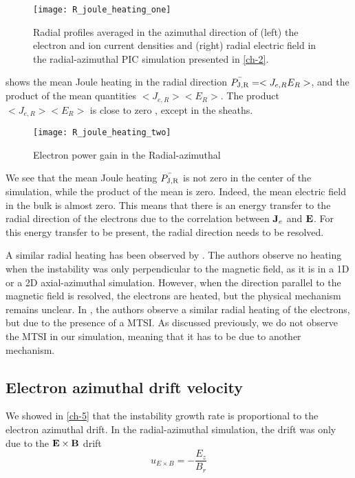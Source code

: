   \begin{figure}[hbt]
    \centering
    \texttt{[image: R\_joule\_heating\_one]}
    \caption{Radial profiles averaged in the azimuthal direction of (left) the electron and ion current densities and (right) radial electric field in the radial-azimuthal \ac{PIC} simulation presented in \cref{ch-2}. }
    \label{fig-epower_radialone}
  \end{figure}

   shows the mean Joule heating in the radial direction $\bar{P_{\rm J, R}} = < J_{e, R} E_R >$, and the product of the mean quantities $< J_{e, R}>  < E_R >$.
  The product $< J_{e, R}>  < E_R >$ is close to zero , except in the sheaths.

  \begin{figure}[hbt]
    \centering
    \texttt{[image: R\_joule\_heating\_two]}
    \caption{Electron power gain in the Radial-azimuthal }
    \label{fig-epower_radial}
  \end{figure}

  We see that the mean Joule heating $\bar{P_{\rm J, R}}$ is not zero in the center of the simulation, while the product of the mean is zero.
  Indeed, the mean electric field in the bulk is almost zero.
  This means that there is an energy transfer to the radial direction of the electrons due to the correlation between ${\mathbf J_e}$ and ${\mathbf E}$.
  For this energy transfer to be present, the radial direction needs to be resolved.

  A similar radial heating has been observed by \citet{heron2013}.
  The authors observe no heating when the instability was only perpendicular to the magnetic field, as it is in a \ac{1D} or a \ac{2D} axial-azimuthal simulation.
  However, when the direction parallel to the magnetic field is resolved, the electrons are heated, but the physical mechanism remains unclear.
  In \citet{janhunen}, the authors observe a similar radial heating of the electrons, but due to the presence of a \ac{MTSI}.
  As discussed previously, we do not observe the \ac{MTSI} in our simulation, meaning that it has to be due to another mechanism.


  \subsection{Electron azimuthal drift velocity} \label{subsec-drift}

  We showed in \cref{ch-5} that the instability growth rate is proportional to the electron azimuthal drift.
  In the radial-azimuthal simulation, the drift was only due to the ${\mathbf E} \times {\mathbf B}$ drift
  \begin{equation} \label{eq-exbdrift}
    u_{E \times B} = - \frac{E_z}{B_r}
  \end{equation}

